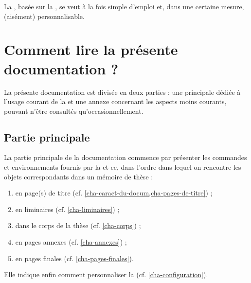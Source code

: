 La \yatcl{}, basée sur la , se veut à la fois simple d'emploi et,
dans une certaine mesure, (aisément) personnalisable.


\section{Comment lire la présente documentation ?}
\label{sec-comment-lire-cette}

La présente documentation est divisée en deux parties : une principale dédiée
à l'usage courant de la \yatcl{} et une annexe concernant les aspects moins
courants, pouvant n'être consultés qu'occasionnellement.

\subsection{Partie principale}
\label{sec-partie-principale}

La partie principale de la documentation commence par présenter les commandes et
environnements fournis par la \yatcl{} et ce, dans l'ordre dans lequel on
rencontre les objets correspondants dans un mémoire de thèse :
\begin{enumerate}
\item en page(s) de titre (cf. \vref{cha-caract-du-docum,cha-pages-de-titre}) ;
\item en \glspl{liminaire} (cf. \vref{cha-liminaires}) ;
\item dans le corps de la thèse (cf. \vref{cha-corps}) ;
\item en pages annexes (cf. \vref{cha-annexes}) ;
\item en pages finales (cf. \vref{cha-pages-finales}).
\end{enumerate}
Elle indique enfin comment personnaliser la \yatcl{}
(cf. \vref{cha-configuration}).

